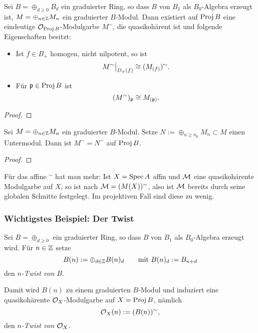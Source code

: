 \begin{satz}
    Sei $B = \oplus_{d\geq 0} B_d$ ein graduierter Ring, so dass
    $B$ von $B_1$ als $B_0$-Algebra erzeugt ist, $M = \oplus_{n\in \mathbb{Z}} M_n$
    ein graduierter $B$-Modul. Dann existiert auf $\operatorname{Proj} B$ eine
    eindeutige $\mathcal{O}_{\operatorname{Proj} B}$-Modulgarbe $M^\sim$, die quasikohärent ist
    und folgende Eigenschaften besitzt:
    \begin{itemize}
      \item Ist $f\in B_+$ homogen, nicht nilpotent, so ist
        \[ M^\sim\big|_{D_+(f)} \cong (M_{(f)})^\sim.\]
      \item Für $\mathfrak{p}\in \operatorname{Proj} B$ ist
        \[ (M^\sim)_\mathfrak{p} \cong M_{(\mathfrak{p})}.\]
    \end{itemize}
\end{satz}
\begin{proof}
\TODO
\end{proof}

\begin{lemma}
    Sei $M = \oplus_{n\in\mathbb{Z}} M_n$ ein graduierter $B$-Modul. Setze
    $N := \oplus_{n\geq n_0} M_n \subset M$ einen Untermodul. Dann ist
    $M^\sim = N^\sim$ auf $\operatorname{Proj} B$. 
\end{lemma}
\begin{proof}
\TODO
\end{proof}

\begin{bemerkung}
    Für das affine $^\sim$ hat man mehr: Ist $X = \operatorname{Spec} A$ affin und
    $\mathcal{M}$ eine quasikohärente Modulgarbe auf $X$, so ist nach 
    $\mathcal{M} = (M(X))^\sim$, also ist $\mathcal{M}$ bereits durch seine globalen Schnitte
    festgelegt. Im projektiven Fall sind diese zu wenig.  
\end{bemerkung}


\subsubsection{Wichtigstes Beispiel: Der Twist}
\begin{definition}[$n$-Twist]
    Sei $B = \oplus_{d\geq 0}$ ein graduierter Ring, so dass $B$ von 
    $B_1$ als $B_0$-Algebra erzeugt wird. Für $n\in \mathbb{Z}$ setze
    \[B(n) := \oplus_{d\in\mathbb{Z}} B(n)_d \qquad\text{mit } B(n)_d := B_{n+d}\]
    den \emph{$n$-Twist von $B$}.
    
    Damit wird $B(n)$ zu einem graduierten $B$-Modul und induziert eine
    quasikohärente $\mathcal{O}_X$-Modulgarbe auf $X = \operatorname{Proj} B$, nämlich
    \[ \mathcal{O}_X(n) := (B(n))^\sim,\]
    den \emph{$n$-Twist von $\mathcal{O}_X$}.
\end{definition}


